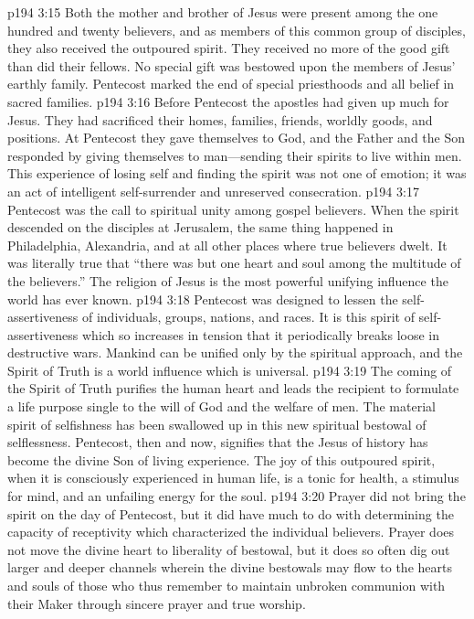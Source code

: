 \pc \vs p194 3:15 Both the mother and brother of Jesus were present among the one hundred and twenty believers, and as members of this common group of disciples, they also received the outpoured spirit. They received no more of the good gift than did their fellows. No special gift was bestowed upon the members of Jesus’ earthly family. Pentecost marked the end of special priesthoods and all belief in sacred families.
\pc \vs p194 3:16 Before Pentecost the apostles had given up much for Jesus. They had sacrificed their homes, families, friends, worldly goods, and positions. At Pentecost they gave themselves to God, and the Father and the Son responded by giving themselves to man---sending their spirits to live within men. This experience of losing self and finding the spirit was not one of emotion; it was an act of intelligent self\hyp{}surrender and unreserved consecration.
\vs p194 3:17 Pentecost was the call to spiritual unity among gospel believers. When the spirit descended on the disciples at Jerusalem, the same thing happened in Philadelphia, Alexandria, and at all other places where true believers dwelt. It was literally true that “there was but one heart and soul among the multitude of the believers.” The religion of Jesus is the most powerful unifying influence the world has ever known.
\pc \vs p194 3:18 Pentecost was designed to lessen the self\hyp{}assertiveness of individuals, groups, nations, and races. It is this spirit of self\hyp{}assertiveness which so increases in tension that it periodically breaks loose in destructive wars. Mankind can be unified only by the spiritual approach, and the Spirit of Truth is a world influence which is universal.
\vs p194 3:19 The coming of the Spirit of Truth purifies the human heart and leads the recipient to formulate a life purpose single to the will of God and the welfare of men. The material spirit of selfishness has been swallowed up in this new spiritual bestowal of selflessness. Pentecost, then and now, signifies that the Jesus of history has become the divine Son of living experience. The joy of this outpoured spirit, when it is consciously experienced in human life, is a tonic for health, a stimulus for mind, and an unfailing energy for the soul.
\pc \vs p194 3:20 Prayer did not bring the spirit on the day of Pentecost, but it did have much to do with determining the capacity of receptivity which characterized the individual believers. Prayer does not move the divine heart to liberality of bestowal, but it does so often dig out larger and deeper channels wherein the divine bestowals may flow to the hearts and souls of those who thus remember to maintain unbroken communion with their Maker through sincere prayer and true worship.\plusone
